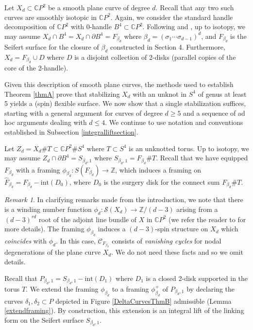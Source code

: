 \documentclass[10pt]{amsart}
\numberwithin{equation}{section}
\theoremstyle{plain}
\theoremstyle{definition}
\theoremstyle{remark}
\newtheorem{rmk}[theorem]{Remark}
\begin{document}
Let $X_d \subset \mathbb{C}P^2$ be a smooth plane curve of degree $d$. Recall that any two such curves are smoothly isotopic in $\mathbb{C}P^2$. Again, we consider the standard handle decomposition of $\mathbb{C}P^2$ with 0-handle $B^4 \subset \mathbb{C}P^2$. Following \cite{AK} and \cite{GS}, up to isotopy, we may assume $X_d \cap B^4 = X_d \cap \partial B^4 = F_{\beta_d}$ where $\beta_d = (\sigma_1\cdots \sigma_{d-1})^d$, and $F_{\beta_d}$ is the Seifert surface for the closure of $\beta_d$ constructed in Section 4. Furthermore, $X_d = F_{\beta_d} \cup D$ where $D$ is a disjoint collection of 2-disks (parallel copies of the core of the 2-handle).

Given this description of smooth plane curves, the methods used to establish Theorem \ref{thmA} prove that stabilizing $X_d$ with an unknot in $S^4$ of genus at least 5 yields a (spin) flexible surface. We now show that a single stabilization suffices, starting with a general argument for curves of degree $d \geq 5$ and a sequence of ad hoc arguments dealing with $d \leq 4$. We continue to use notation and conventions established in Subsection \ref{integralliftsection}. 

Let $Z_d = X_d \# T \subset \mathbb{C}P^2 \# S^4$ where $T \subset S^4$ is an unknotted torus. Up to isotopy, we may assume $Z_d \cap \partial B^4 = S_{\beta_d,1}$ where $S_{\beta_d,1} = F_{\beta_d} \# T$. Recall that we have equipped $F_{\beta_d}$ with a framing $\phi_{\beta_d} : S(F_{\beta_d}) \to \mathbb{Z}$, which induces a framing on $\widehat{F}_{\beta_d} = F_{\beta_d} - \textrm{int}(D_0)$, where $D_0$ is the surgery disk for the connect sum $F_{\beta_d} \# T$. 




\begin{rmk}
In clarifying remarks made from the introduction, we note that there is a winding number function $\phi_d : \mathcal{S}(X_d) \to \mathbb{Z}/(d-3)$ arising from a $(d-3)^{rd}$ root of the adjoint line bundle of $X$ in $\mathbb{C}P^2$ (we refer the reader to \cite{SalterToric} for more details). The framing $\phi_{\beta_d}$ induces a $(d-3)$-spin structure on $X_d$ which \textit{coincides} with $\phi_d$. In this case, $\mathcal{C}_{F_{\beta_d}}$ consists of \textit{vanishing cycles} for nodal degenerations of the plane curve $X_d$. We do not need these facts and so we omit details. 
\end{rmk}


Recall that $P_{\beta_d,1} = S_{\beta_d,1} - \textrm{int}(D_1)$ where $D_1$ is a closed 2-disk supported in the torus $T$. We extend the framing $\phi_{\beta_d}$ to a framing $\phi^+_{\beta_d}$ of $P_{\beta_d,1}$ by declaring the curves $\delta_1,\delta_2 \subset P$ depicted in Figure \ref{DeltaCurvesThmB} admissible (Lemma \ref{extendframing}).  By construction, this extension is an integral lift of the linking form on the Seifert surface $S_{\beta_d,1}$. 
\end{document}
